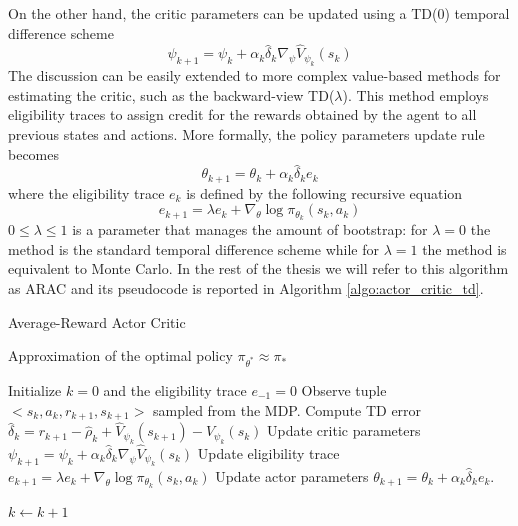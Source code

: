 On the other hand, the critic parameters can be updated using a TD(0) temporal difference scheme
\begin{equation}
	\psi_{k+1} = \psi_k + \alpha_k \widehat{\delta}_k \nabla_\psi \widehat{V}_{\psi_k}(s_k)
\end{equation}
The discussion can be easily extended to more complex value-based methods for estimating the critic, such as the backward-view TD($\lambda$). This method employs eligibility traces to assign credit for the rewards obtained by the agent to all previous states and actions. More formally, the policy parameters update rule becomes
\begin{equation}
	\theta_{k+1} = \theta_k + \alpha_k \widehat{\delta}_k e_k
\end{equation}
where the eligibility trace $e_k$ is defined by the following recursive equation 
\begin{equation}
	e_{k+1} = \lambda e_k + \nabla_\theta\log \pi_{\theta_k}(s_k,a_k) 
\end{equation} 
$0 \leq \lambda \leq 1$ is a parameter that manages the amount of bootstrap: for $\lambda = 0$ the method is the standard temporal difference scheme while for $\lambda = 1$ the method is equivalent to Monte Carlo. In the rest of the thesis we will refer to this algorithm as \gls{ARAC} and its pseudocode is reported in Algorithm \ref{algo:actor_critic_td}. 
\begin{algorithm}[t!]
	\caption{Average-Reward Actor Critic}
	\label{algo:actor_critic_td}
	\begin{algorithmic}[0]
		\Ensure Approximation of the optimal policy $\pi_{\theta^*} \approx \pi_*$
		\begin{algorithmic}[1]
		\State Initialize $k = 0$ and the eligibility trace $e_{-1} = 0$
		\Repeat
			\State Observe tuple $<s_k, a_k, r_{k+1}, s_{k+1}>$ sampled from the MDP.
			\State Compute TD error $\widehat{\delta}_k = r_{k+1} - \widehat{\rho}_k + \widehat{V}_{\psi_k}(s_{k+1}) - \widehat{V}_{\psi_k}(s_k) $
			\State Update critic parameters $	\psi_{k+1} = \psi_k + \alpha_k \widehat{\delta}_k \nabla_\psi \widehat{V}_{\psi_k}(s_k)$ 
			\State Update eligibility trace $e_{k+1} = \lambda e_k + \nabla_\theta\log \pi_{\theta_k}(s_k,a_k)$
			\State Update actor parameters $\theta_{k+1} = \theta_k + \alpha_k \widehat{\delta}_k e_k $. 
			
			\State $k \leftarrow k + 1$
		\end{algorithmic}
	\end{algorithmic}
\end{algorithm}


